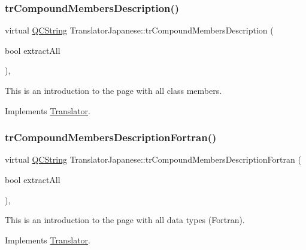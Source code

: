 \subsubsection{\texorpdfstring{trCompoundMembersDescription()}{trCompoundMembersDescription()}}
{\footnotesize\ttfamily virtual \mbox{\hyperlink{class_q_c_string}{Q\+C\+String}} Translator\+Japanese\+::tr\+Compound\+Members\+Description (\begin{DoxyParamCaption}\item[{bool}]{extract\+All }\end{DoxyParamCaption})\hspace{0.3cm}{\ttfamily [inline]}, {\ttfamily [virtual]}}

This is an introduction to the page with all class members. 

Implements \mbox{\hyperlink{class_translator}{Translator}}.

\mbox{\label{class_translator_japanese_a23b306cff1d8f703e3a1789414ad6111}} 
\subsubsection{\texorpdfstring{trCompoundMembersDescriptionFortran()}{trCompoundMembersDescriptionFortran()}}
{\footnotesize\ttfamily virtual \mbox{\hyperlink{class_q_c_string}{Q\+C\+String}} Translator\+Japanese\+::tr\+Compound\+Members\+Description\+Fortran (\begin{DoxyParamCaption}\item[{bool}]{extract\+All }\end{DoxyParamCaption})\hspace{0.3cm}{\ttfamily [inline]}, {\ttfamily [virtual]}}

This is an introduction to the page with all data types (Fortran). 

Implements \mbox{\hyperlink{class_translator}{Translator}}.

\mbox{\label{class_translator_japanese_a33ef8b96e715216da5a944f4cd64d254}} 
